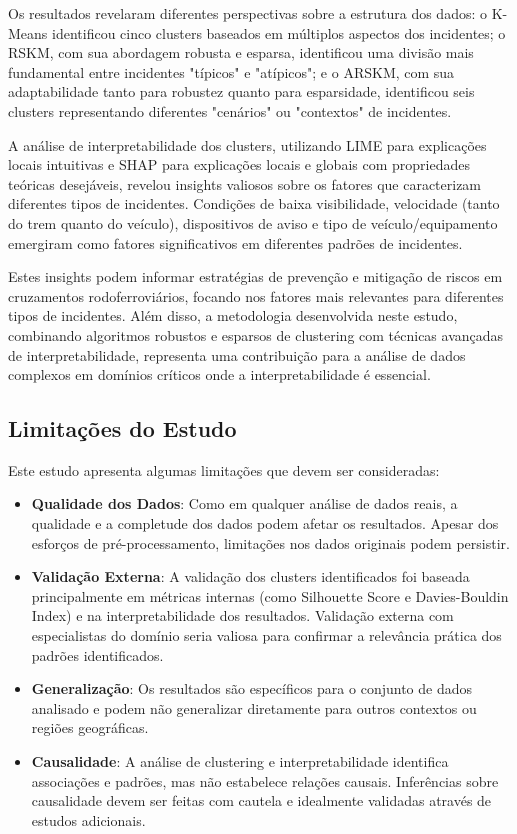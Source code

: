 \documentclass[conference]{IEEEtran}
\begin{document}
Os resultados revelaram diferentes perspectivas sobre a estrutura dos dados: o K-Means identificou cinco clusters baseados em múltiplos aspectos dos incidentes; o RSKM, com sua abordagem robusta e esparsa, identificou uma divisão mais fundamental entre incidentes "típicos" e "atípicos"; e o ARSKM, com sua adaptabilidade tanto para robustez quanto para esparsidade, identificou seis clusters representando diferentes "cenários" ou "contextos" de incidentes.

A análise de interpretabilidade dos clusters, utilizando LIME para explicações locais intuitivas e SHAP para explicações locais e globais com propriedades teóricas desejáveis, revelou insights valiosos sobre os fatores que caracterizam diferentes tipos de incidentes. Condições de baixa visibilidade, velocidade (tanto do trem quanto do veículo), dispositivos de aviso e tipo de veículo/equipamento emergiram como fatores significativos em diferentes padrões de incidentes.

Estes insights podem informar estratégias de prevenção e mitigação de riscos em cruzamentos rodoferroviários, focando nos fatores mais relevantes para diferentes tipos de incidentes. Além disso, a metodologia desenvolvida neste estudo, combinando algoritmos robustos e esparsos de clustering com técnicas avançadas de interpretabilidade, representa uma contribuição para a análise de dados complexos em domínios críticos onde a interpretabilidade é essencial.

\subsection{Limitações do Estudo}
Este estudo apresenta algumas limitações que devem ser consideradas:

\begin{itemize}
    \item \textbf{Qualidade dos Dados}: Como em qualquer análise de dados reais, a qualidade e a completude dos dados podem afetar os resultados. Apesar dos esforços de pré-processamento, limitações nos dados originais podem persistir.
    
    \item \textbf{Validação Externa}: A validação dos clusters identificados foi baseada principalmente em métricas internas (como Silhouette Score e Davies-Bouldin Index) e na interpretabilidade dos resultados. Validação externa com especialistas do domínio seria valiosa para confirmar a relevância prática dos padrões identificados.
    
    \item \textbf{Generalização}: Os resultados são específicos para o conjunto de dados analisado e podem não generalizar diretamente para outros contextos ou regiões geográficas.
    
    \item \textbf{Causalidade}: A análise de clustering e interpretabilidade identifica associações e padrões, mas não estabelece relações causais. Inferências sobre causalidade devem ser feitas com cautela e idealmente validadas através de estudos adicionais.
\end{itemize}
\end{document}
